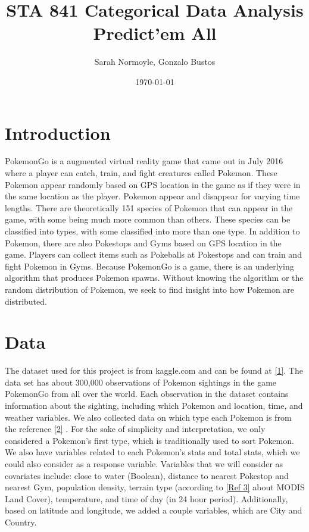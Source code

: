 \documentclass{article}
\begin{document}
\title{STA 841 Categorical Data Analysis \\ Predict'em All}
\author{Sarah Normoyle, Gonzalo Bustos}
\date{\today}
\maketitle


\section{Introduction}

PokemonGo is a augmented virtual reality game that came out in July 2016 where a player can catch, train, and fight creatures called Pokemon. These Pokemon appear randomly based on GPS location in the game as if they were in the same location as the player. Pokemon appear and disappear for varying time lengths. There are theoretically 151 species of Pokemon that can appear in the game, with some being much more common than others. These species can be classified into types, with some classified into more than one type. In addition to Pokemon, there are also Pokestops and Gyms based on GPS location in the game. Players can collect items such as Pokeballs at Pokestops and can train and fight Pokemon in Gyms. Because PokemonGo is a game, there is an underlying algorithm that produces Pokemon spawns. Without knowing the algorithm or the random distribution of Pokemon, we seek to find insight into how Pokemon are distributed. 


\section{Data}

The dataset used for this project is from kaggle.com and can be found at \hyperlink{Ref1}{[1]}.  The data set has about 300,000 observations of Pokemon sightings in the game PokemonGo from all over the world. Each observation in the dataset contains information about the sighting, including which Pokemon and location, time, and weather variables. We also collected data on which type each Pokemon is from the reference \hyperlink{Ref2}{[2]} . For the sake of simplicity and interpretation, we only considered a Pokemon's first type, which is traditionally used to sort Pokemon. We also have variables related to each Pokemon's stats and total stats, which we could also consider as a response variable. Variables that we will consider as covariates include: close to water (Boolean), distance to nearest Pokestop and nearest Gym, population density, terrain type (according to \hyperlink{Ref3}{[Ref 3]} about MODIS Land Cover), temperature, and time of day (in 24 hour period). Additionally, based on latitude and longitude, we added a couple variables, which are City and Country.
\end{document}
